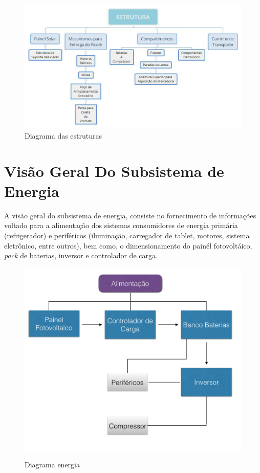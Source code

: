 \begin{figure}[H]
	\centering
    
    \includegraphics[width=\textwidth]{figuras/Vis_o_Geral_-_ESTRUTURA}
    \caption{Diagrama das estruturas}
    \label{fig:Vis_o_Geral_-_ESTRUTURA}
\end{figure}

\section{Visão Geral Do Subsistema de Energia}

A visão geral do subsistema de energia, consiste no fornecimento de informações voltado para a alimentação dos sistemas consumidores de energia primária (refrigerador) e periféricos (iluminação, carregador de tablet, motores, sistema eletrônico, entre outros), bem como, o dimensionamento do painél fotovoltáico,  \textit{pack} de baterias, inversor e controlador de carga. 

\begin{figure}[H]
	\centering
    
    \includegraphics[scale=0.8]{figuras/diagrama_energia}
    \label{fig:diagrama_energia}
    \caption{Diagrama energia}
\end{figure}
